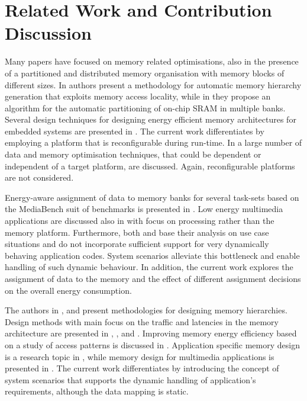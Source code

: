 \documentclass[smallcondensed]{svjour3}
\begin{document}
\section{Related Work and Contribution Discussion}
\label{sec:related}

Many papers have focused on memory related optimisations, also in the presence of a partitioned and distributed memory organisation with memory blocks of different sizes. 
In \cite{Ben00b} authors present a methodology for automatic memory hierarchy generation that exploits memory access locality, while in \cite{Ben00c} they propose an algorithm for the automatic partitioning of on-chip SRAM in multiple banks. 
Several design techniques for designing energy efficient memory architectures for embedded systems are presented in \cite{Mac02}. 
The current work differentiates by employing a platform that is reconfigurable during run-time. 
In \cite{Pgk01} a large number of data and memory optimisation techniques, that could be dependent or independent of a target platform, are discussed. 
Again, reconfigurable platforms are not considered.

Energy-aware assignment of data to memory banks for several task-sets based on the MediaBench suit of benchmarks is presented in \cite{Mar03}. 
Low energy multimedia applications are discussed also in \cite{Chu02} with focus on processing rather than the memory platform. 
Furthermore, both \cite{Mar03} and \cite{Chu02} base their analysis on use case situations and do not incorporate sufficient support for very dynamically behaving application codes. 
System scenarios alleviate this bottleneck and enable handling of such dynamic behaviour. 
In addition, the current work explores the assignment of data to the memory and the effect of different assignment decisions on the overall energy consumption.

The authors in \cite{abraham1999automatic}, \cite{jacob1996analytical} and \cite{li1999hardware} present methodologies for designing memory hierarchies.
Design methods with main focus on the traffic and latencies in the memory architecture are presented in \cite{chen1999loop}, \cite{grun2000mist}, \cite{jantsch1994hardware} and \cite{passes1995multi}.
Improving memory energy efficiency based on a study of access patterns is discussed in \cite{kandemir2001improving}.
Application specific memory design is a research topic in \cite{schmit1997synthesis}, while memory design for multimedia applications is presented in \cite{oshima1997high}.
The current work differentiates by introducing the concept of system scenarios that supports the dynamic handling of application's requirements, although the data mapping is static. 
\end{document}
